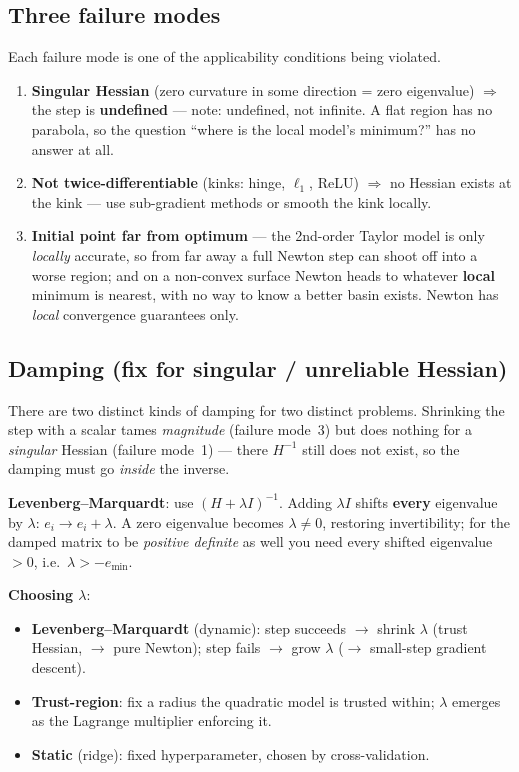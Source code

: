 \documentclass[11pt, a4paper]{article}
\newcommand{\kw}[1]{\textbf{#1}}
\begin{document}
\subsection{Three failure modes}

Each failure mode is one of the applicability conditions being violated.

\begin{enumerate}
  \item \kw{Singular Hessian} (zero curvature in some direction = zero eigenvalue) $\Rightarrow$ the
  step is \kw{undefined} — note: undefined, not infinite. A flat region has no parabola, so the
  question ``where is the local model's minimum?'' has no answer at all.
  \item \kw{Not twice-differentiable} (kinks: hinge, $\ell_1$, ReLU) $\Rightarrow$ no Hessian exists
  at the kink — use sub-gradient methods or smooth the kink locally.
  \item \kw{Initial point far from optimum} — the 2nd-order Taylor model is only \emph{locally}
  accurate, so from far away a full Newton step can shoot off into a worse region; and on a
  non-convex surface Newton heads to whatever \kw{local} minimum is nearest, with no way to know a
  better basin exists. Newton has \emph{local} convergence guarantees only.
\end{enumerate}

\subsection{Damping (fix for singular / unreliable Hessian)}

There are two distinct kinds of damping for two distinct problems. Shrinking the step with a scalar
tames \emph{magnitude} (failure mode~3) but does nothing for a \emph{singular} Hessian (failure
mode~1) — there $H^{-1}$ still does not exist, so the damping must go \emph{inside} the inverse.

\kw{Levenberg–Marquardt}: use $(H+\lambda I)^{-1}$. Adding $\lambda I$ shifts \kw{every} eigenvalue by
$\lambda$: $e_i\to e_i+\lambda$. A zero eigenvalue becomes $\lambda\ne0$, restoring invertibility; for
the damped matrix to be \emph{positive definite} as well you need every shifted eigenvalue $>0$,
i.e.\ $\lambda>-e_{\min}$.

\kw{Choosing $\lambda$}:
\begin{itemize}
  \item \kw{Levenberg–Marquardt} (dynamic): step succeeds $\to$ shrink $\lambda$ (trust Hessian, $\to$
  pure Newton); step fails $\to$ grow $\lambda$ ($\to$ small-step gradient descent).
  \item \kw{Trust-region}: fix a radius the quadratic model is trusted within; $\lambda$ emerges as
  the Lagrange multiplier enforcing it.
  \item \kw{Static} (ridge): fixed hyperparameter, chosen by cross-validation.
\end{itemize}
\end{document}

